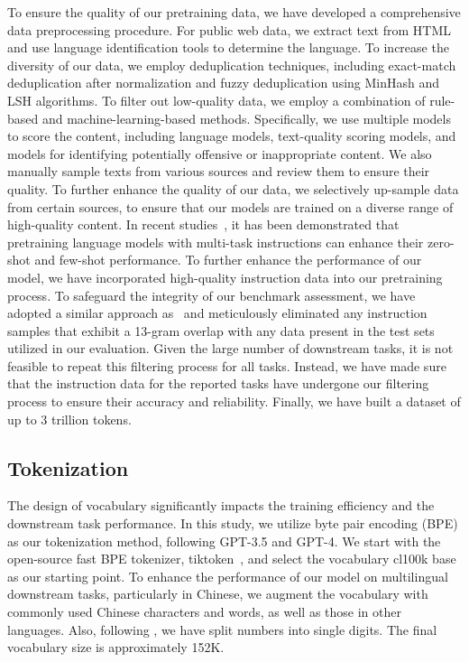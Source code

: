 To ensure the quality of our pretraining data, we have developed a comprehensive data preprocessing procedure. For public web data, we extract text from HTML and use language identification tools to determine the language. To increase the diversity of our data, we employ deduplication techniques, including exact-match deduplication after normalization and fuzzy deduplication using MinHash and LSH algorithms. To filter out low-quality data, we employ a combination of rule-based and machine-learning-based methods. Specifically, we use multiple models to score the content, including language models, text-quality scoring models, and models for identifying potentially offensive or inappropriate content. We also manually sample texts from various sources and review them to ensure their quality. To further enhance the quality of our data, we selectively up-sample data from certain sources, to ensure that our models are trained on a diverse range of high-quality content. In recent studies~\citep{glm-130b,ext5,t5}, it has been demonstrated that pretraining language models with multi-task instructions can enhance their zero-shot and few-shot performance. To further enhance the performance of our model, we have incorporated high-quality instruction data into our pretraining process. To safeguard the integrity of our benchmark assessment, we have adopted a similar approach as~\citet{gpt3} and meticulously eliminated any instruction samples that exhibit a 13-gram overlap with any data present in the test sets utilized in our evaluation. Given the large number of downstream tasks, it is not feasible to repeat this filtering process for all tasks. Instead, we have made sure that the instruction data for the reported tasks have undergone our filtering process to ensure their accuracy and reliability. Finally, we have built a dataset of up to \num{3} trillion tokens.

\subsection{Tokenization} 
The design of vocabulary significantly impacts the training efficiency and the downstream task performance. In this study, we utilize byte pair encoding (BPE) as our tokenization method, following GPT-3.5 and GPT-4. We start with the open-source fast BPE tokenizer, tiktoken~\citep{tiktoken}, and select the vocabulary \textrm{cl100k} base as our starting point. To enhance the performance of our model on multilingual downstream tasks, particularly in Chinese, we augment the vocabulary with commonly used Chinese characters and words, as well as those in other languages. Also, following \citet{llama, llama2}, we have split numbers into single digits. The final vocabulary size is approximately \num{152}K.

